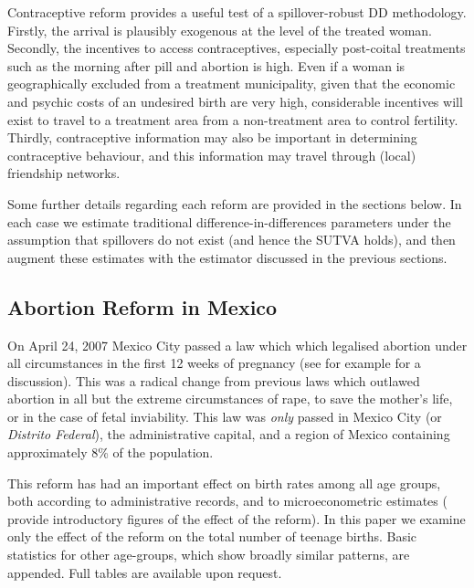 Contraceptive reform provides a useful test of a spillover-robust DD methodology.
Firstly, the arrival is plausibly exogenous at the level of the treated woman.
Secondly, the incentives to access contraceptives, especially post-coital 
treatments such as the morning after pill and abortion is high.  Even if a woman
is geographically excluded from a treatment municipality, given that the economic
and psychic costs of an undesired birth are very high, considerable incentives
will exist to travel to a treatment area from a non-treatment area to control
fertility.  Thirdly, contraceptive information may also be important in
determining contraceptive behaviour, and this information may travel through
(local) friendship networks.

Some further details regarding each reform are provided in the sections below.
In each case we estimate traditional difference-in-differences parameters under
the assumption that spillovers do not exist (and hence the SUTVA holds), and
then augment these estimates with the estimator discussed in the previous
sections.

\subsection{Abortion Reform in Mexico}
On April 24, 2007 Mexico City passed a law which which legalised abortion 
under all circumstances in the first 12 weeks of pregnancy (see for example
\citet{Fraser2014} for a discussion).  This was a radical change from previous 
laws which outlawed abortion in all but the extreme circumstances of rape, 
to save the mother's life, or in the case of fetal inviability.  This law was 
\emph{only} passed in Mexico City (or \emph{Distrito Federal}), the 
administrative capital, and a region of Mexico containing approximately 8\% 
of the population.

This reform has had an important effect on birth rates among all age groups,
both according to administrative records, and to microeconometric estimates
(\citet{ClarkeMuhlrad2014} provide introductory figures of the effect of the
reform).  In this paper we examine only the effect of the reform on the total
number of teenage births.  Basic statistics for other age-groups, which show 
broadly similar patterns, are appended.  Full tables are available upon 
request.

